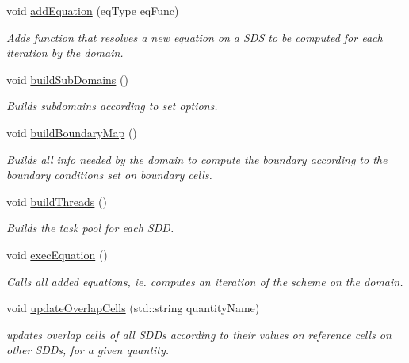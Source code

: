 \begin{DoxyCompactItemize}
void \hyperlink{classDomain_ab24a61d835dbebec7ff689ec8c7f2a95}{add\+Equation} (eq\+Type eq\+Func)
\begin{DoxyCompactList}\small\item\em Adds function that resolves a new equation on a S\+DS to be computed for each iteration by the domain. \end{DoxyCompactList}\item 
void \hyperlink{classDomain_a29537b651bacd922cae449357969d900}{build\+Sub\+Domains} ()
\begin{DoxyCompactList}\small\item\em Builds subdomains according to set options. \end{DoxyCompactList}\item 
\mbox{\label{classDomain_a4d1ecd27481f6c7c0b077225fa48bc99}} 
void \hyperlink{classDomain_a4d1ecd27481f6c7c0b077225fa48bc99}{build\+Boundary\+Map} ()
\begin{DoxyCompactList}\small\item\em Builds all info needed by the domain to compute the boundary according to the boundary conditions set on boundary cells. \end{DoxyCompactList}\item 
void \hyperlink{classDomain_aa2e6cebf44a57323f3c6344d131126c1}{build\+Threads} ()
\begin{DoxyCompactList}\small\item\em Builds the task pool for each S\+DD. \end{DoxyCompactList}\item 
\mbox{\label{classDomain_ae587a47610505c21fdd32a9f82d70402}} 
void \hyperlink{classDomain_ae587a47610505c21fdd32a9f82d70402}{exec\+Equation} ()
\begin{DoxyCompactList}\small\item\em Calls all added equations, ie. computes an iteration of the scheme on the domain. \end{DoxyCompactList}\item 
void \hyperlink{classDomain_abcd8aa2529907b8022e41e45c85f5144}{update\+Overlap\+Cells} (std\+::string quantity\+Name)
\begin{DoxyCompactList}\small\item\em updates overlap cells of all S\+D\+Ds according to their values on reference cells on other S\+D\+Ds, for a given quantity. \end{DoxyCompactList}\item 

\end{DoxyCompactItemize}
